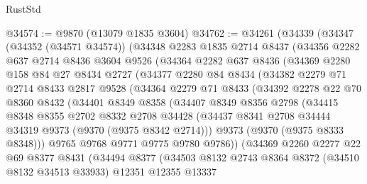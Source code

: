 \begin{lexlean}{RustStd}
\begin{coremodule}
{\begin{coremodule}
{{{{{{{{{{{{{{{{{{{{{{{{{{{{{{{{{{{{{{{@34574 := @9870 (@13079 @1835 @3604)
@34762 := @34261
    (@34339
      (@34347
        (@34352 (@34571 @34574))
        (@34348
          @2283
          @1835
          @2714
          @8437
          (@34356
            @2282
            @637
            @2714
            @8436
            @3604
            @9526
            (@34364
              @2282
              @637
              @8436
              (@34369
                @2280
                @158
                @84
                @27
                @8434
                @2727
                (@34377
                  @2280
                  @84
                  @8434
                  (@34382
                    @2279
                    @71
                    @2714
                    @8433
                    @2817
                    @9528
                    (@34364
                      @2279
                      @71
                      @8433
                      (@34392
                        @2278
                        @22
                        @70
                        @8360
                        @8432
                        (@34401
                          @8349
                          @8358
                          (@34407
                            @8349
                            @8356
                            @2798
                            (@34415
                              @8348
                              @8355
                              @2702
                              @8332
                              @2708
                              @34428
                              (@34437 @8341 @2708 @34444 @34319 @9373 (@9370 (@9375 @8342 @2714)))
                              @9373
                              (@9370 (@9375 @8333 @8348)))
                            @9765
                            @9768
                            @9771
                            @9775
                            @9780
                            @9786))
                        (@34369
                          @2260
                          @2277
                          @22
                          @69
                          @8377
                          @8431
                          (@34494
                            @8377
                            (@34503
                              @8132
                              @2743
                              @8364
                              @8372
                              (@34510 @8132 @34513 @33933)
                              @12351
                              @12355
                              @13337
}}}}}}}}}}}}}}}}}}}}}}}}}}}}}}}}}}}}}}}
\end{coremodule}}
\end{coremodule}
\end{lexlean}

